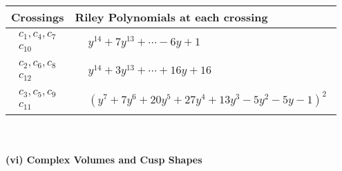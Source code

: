 \documentclass[1p]{elsarticle_modified}
\theoremstyle{definition}
\begin{document}
\begin{tabular}{m{50pt}|m{274pt}}
Crossings & \hspace{64pt}Riley Polynomials at each crossing \\
\hline $$\begin{aligned}c_{1},c_{4},c_{7}\\c_{10}\end{aligned}$$&$\begin{aligned}
&y^{14}+7 y^{13}+\cdots-6 y+1
\end{aligned}$\\
\hline $$\begin{aligned}c_{2},c_{6},c_{8}\\c_{12}\end{aligned}$$&$\begin{aligned}
&y^{14}+3 y^{13}+\cdots+16 y+16
\end{aligned}$\\
\hline $$\begin{aligned}c_{3},c_{5},c_{9}\\c_{11}\end{aligned}$$&$\begin{aligned}
&(y^7+7 y^6+20 y^5+27 y^4+13 y^3-5 y^2-5 y-1)^2
\end{aligned}$\\
\hline
\end{tabular}\\~\\
\newpage\flushleft \textbf{(vi) Complex Volumes and Cusp Shapes}
\end{document}
